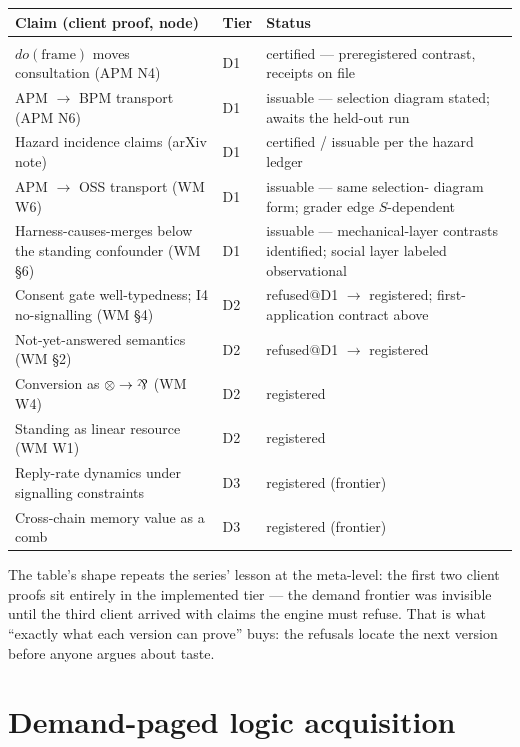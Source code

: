 \documentclass[11pt]{article}
\newcommand{\parr}{\rotatebox[origin=c]{180}{\&}}
\begin{document}
\begin{center}
\small
\begin{tabular}{p{} p{} p{}}
\textbf{Claim (client proof, node)} & \textbf{Tier} & \textbf{Status}\\[2pt]
\hline\\[-8pt]
$do(\textrm{frame})$ moves consultation (APM N4) & D1 &
certified --- preregistered contrast, receipts on file\\[3pt]
APM $\to$ BPM transport (APM N6) & D1 & issuable --- selection
diagram stated; awaits the held-out run\\[3pt]
Hazard incidence claims (arXiv note) & D1 & certified /
issuable per the hazard ledger\\[3pt]
APM $\to$ OSS transport (WM W6) & D1 & issuable --- same selection-%
diagram form; grader edge $S$-dependent\\[3pt]
Harness-causes-merges below the standing confounder (WM \S6) & D1 &
issuable --- mechanical-layer contrasts identified; social layer
labeled observational\\[3pt]
Consent gate well-typedness; I4 no-signalling (WM \S4) & D2 &
refused$@$D1 $\to$ registered; first-application contract above\\[3pt]
Not-yet-answered semantics (WM \S2) & D2 & refused$@$D1 $\to$
registered\\[3pt]
Conversion as $\otimes\to\parr$ (WM W4) & D2 & registered\\[3pt]
Standing as linear resource (WM W1) & D2 & registered\\[3pt]
Reply-rate dynamics under signalling constraints & D3 & registered
(frontier)\\[3pt]
Cross-chain memory value as a comb & D3 & registered (frontier)\\
\hline
\end{tabular}
\end{center}

\medskip
The table's shape repeats the series' lesson at the meta-level: the
first two client proofs sit entirely in the implemented tier ---
the demand frontier was invisible until the third client arrived
with claims the engine must refuse. That is what ``exactly what
each version can prove'' buys: the refusals locate the next version
before anyone argues about taste.

\section{Demand-paged logic acquisition}
\end{document}
